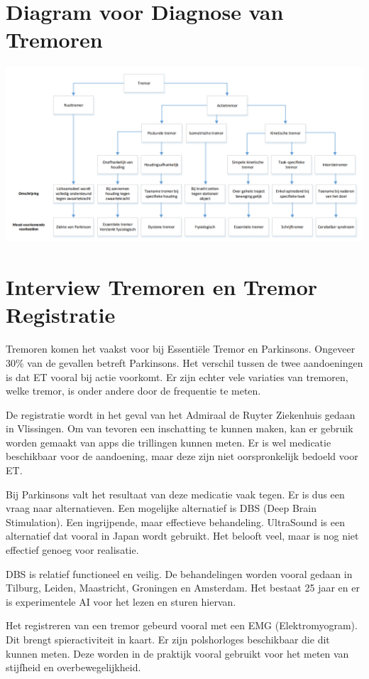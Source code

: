 \appendix
\section{Diagram voor Diagnose van Tremoren}
\label{appendix:diagnose}

\includegraphics[width=\textwidth]{graphics/graph-tremor-diagnosis.png}

\section{Interview Tremoren en Tremor Registratie}

Tremoren komen het vaakst voor bij Essentiële Tremor en Parkinsons.
Ongeveer 30\% van de gevallen betreft Parkinsons.
Het verschil tussen de twee aandoeningen is dat ET vooral bij actie voorkomt.
Er zijn echter vele variaties van tremoren, welke tremor, is onder andere door de frequentie te meten.

De registratie wordt in het geval van het Admiraal de Ruyter Ziekenhuis gedaan in Vlissingen.
Om van tevoren een inschatting te kunnen maken, kan er gebruik worden gemaakt van apps die trillingen kunnen meten.
Er is wel medicatie beschikbaar voor de aandoening, maar deze zijn niet oorspronkelijk bedoeld voor ET.

Bij Parkinsons valt het resultaat van deze medicatie vaak tegen. Er is dus een vraag naar alternatieven.
Een mogelijke alternatief is DBS (Deep Brain Stimulation). Een ingrijpende, maar effectieve behandeling.
UltraSound is een alternatief dat vooral in Japan wordt gebruikt. Het belooft veel,
maar is nog niet effectief genoeg voor realisatie.

DBS is relatief functioneel en veilig. De behandelingen worden vooral gedaan in Tilburg, Leiden,
Maastricht, Groningen en Amsterdam. Het bestaat 25 jaar en er is experimentele AI voor het lezen en sturen hiervan.

Het registreren van een tremor gebeurd vooral met een EMG (Elektromyogram). Dit brengt spieractiviteit in kaart.
Er zijn polshorloges beschikbaar die dit kunnen meten. 
Deze worden in de praktijk vooral gebruikt voor het meten van stijfheid en overbewegelijkheid.